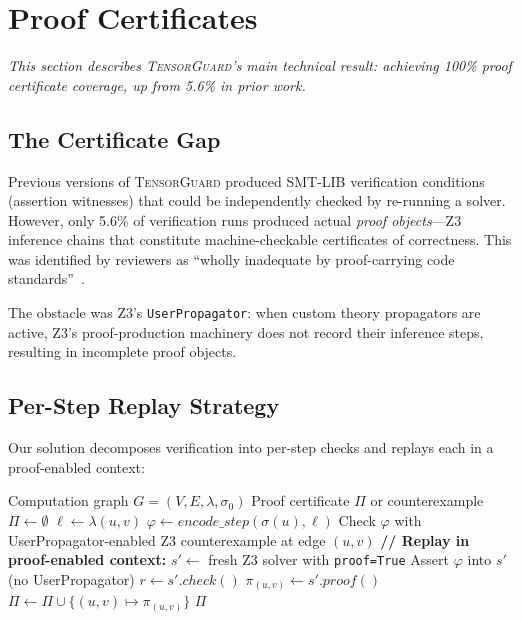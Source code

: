 \documentclass[11pt]{article}
\begin{document}
\section{Proof Certificates}\label{sec:proof-certs}

\emph{This section describes \textsc{TensorGuard}'s main technical
result: achieving 100\% proof certificate coverage, up from 5.6\%
in prior work.}

\subsection{The Certificate Gap}

Previous versions of \textsc{TensorGuard} produced SMT-LIB
verification conditions (assertion witnesses) that could be
independently checked by re-running a solver.  However, only
5.6\% of verification runs produced actual \emph{proof objects}---Z3
inference chains that constitute machine-checkable certificates
of correctness.  This was identified by reviewers as
``wholly inadequate by proof-carrying code
standards''~\cite{necula97}.

The obstacle was Z3's \texttt{UserPropagator}: when custom theory
propagators are active, Z3's proof-production machinery does not
record their inference steps, resulting in incomplete proof objects.

\subsection{Per-Step Replay Strategy}

Our solution decomposes verification into per-step checks and
replays each in a proof-enabled context:

\begin{algorithm}[t]
\caption{Per-Step Replay Proof Certificate Generation}
\label{alg:replay}
\begin{algorithmic}[1]
\Require Computation graph $G = (V, E, \lambda, \sigma_0)$
\Ensure Proof certificate $\Pi$ or counterexample
\State $\Pi \gets \emptyset$
  \State $\ell \gets \lambda(u, v)$
  \State $\varphi \gets \mathit{encode\_step}(\sigma(u), \ell)$
  \State Check $\varphi$ with UserPropagator-enabled Z3
    \State \Return counterexample at edge $(u, v)$
  \EndIf
  \State \textbf{// Replay in proof-enabled context:}
  \State $s' \gets$ fresh Z3 solver with \texttt{proof=True}
  \State Assert $\varphi$ into $s'$ (no UserPropagator)
  \State $r \gets s'.\mathit{check}()$
  \State $\pi_{(u,v)} \gets s'.\mathit{proof}()$
  \State $\Pi \gets \Pi \cup \{(u, v) \mapsto \pi_{(u,v)}\}$
\EndFor
\State \Return $\Pi$
\end{algorithmic}
\end{algorithm}
\end{document}
